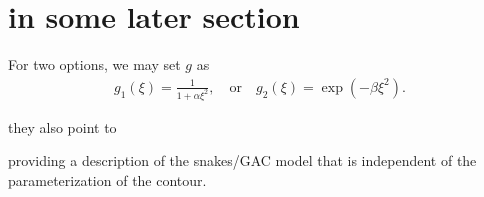 \section{in some later section} 
For two options, we may set $g$ as
\begin{align*}
g_1(\xi) 
= \frac{1}{1 + \alpha\xi^2},
\quad\text{or}\quad 
g_2(\xi) 
= \exp(-\beta\xi^2).
\end{align*}


they also point to 

providing a description of the snakes/GAC model that is independent of the parameterization of the contour.